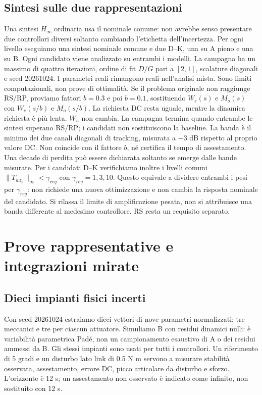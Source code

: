 \section{Sintesi sulle due rappresentazioni}
Una sintesi $H_\infty$ ordinaria usa il nominale comune: non avrebbe senso
presentare due controllori diversi soltanto cambiando l'etichetta
dell'incertezza. Per ogni livello eseguiamo una sintesi nominale comune
e due D--K, una su A pieno e una su B. Ogni candidato viene analizzato
su entrambi i modelli.
La campagna ha un massimo di quattro iterazioni, ordine di fit $D/G$
pari a $[2,1]$, scalature diagonali e seed 20261024. I parametri reali
rimangono reali nell'analisi mista. Sono limiti computazionali, non prove di
ottimalità. Se il problema originale non raggiunge RS/RP, proviamo fattori
$b=0.3$ e poi $b=0.1$, sostituendo $W_e(s)$ e $M_o(s)$ con
$W_e(s/b)$ e $M_o(s/b)$. La richiesta DC resta uguale, mentre la dinamica
richiesta è più lenta. $W_u$ non cambia. La campagna termina quando
entrambe le sintesi superano RS/RP; i candidati non sostituiscono la baseline.
La banda è il minimo dei due canali diagonali di tracking, misurata a
$-3$ dB rispetto al proprio valore DC. Non coincide con il fattore $b$,
né certifica il tempo di assestamento. Una decade di perdita può essere
dichiarata soltanto se emerge dalle bande misurate.
Per i candidati D--K verifichiamo inoltre i livelli comuni
$\|T_{wz_p}\|_\infty<\gamma_{req}$ con $\gamma_{req}=1,3,10$.
Questo equivale a dividere entrambi i pesi per $\gamma_{req}$: non richiede
una nuova ottimizzazione e non cambia la risposta nominale del candidato.
Si rilassa il limite di amplificazione pesata, non si attribuisce una
banda differente al medesimo controllore. RS resta un requisito separato.

\chapter{Prove rappresentative e integrazioni mirate}
\section{Dieci impianti fisici incerti}
Con seed 20261024 estraiamo dieci vettori di nove parametri normalizzati:
tre meccanici e tre per ciascun attuatore. Simuliamo B con residui dinamici
nulli: è variabilità parametrica Padé, non un campionamento esaustivo di
A o dei residui ammessi da B. Gli stessi impianti sono usati per tutti
i controllori. Un riferimento di 5 gradi e un disturbo lato link di
0.5 N m servono a misurare stabilità osservata, assestamento, errore DC,
picco articolare da disturbo e sforzo. L'orizzonte è 12 s; un assestamento
non osservato è indicato come infinito, non sostituito con 12 s.
